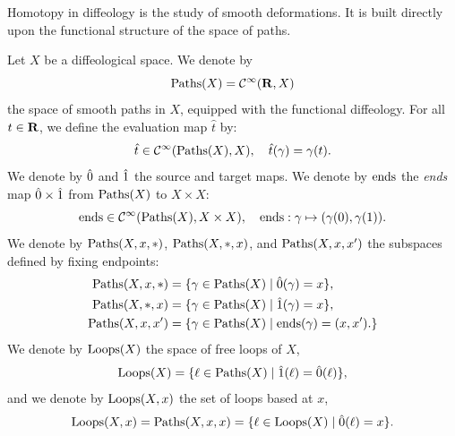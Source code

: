  \begin{article}
    Homotopy in diffeology is the study of smooth deformations.
    It is built directly upon the functional structure of the space of paths.
    
    Let $X$ be a diffeological space.
    We denote by
    $$
      \operatorname{Paths}(X) = {\mathcal{C}}^\infty({\mathbf{R}},X)
      $$
    the space of smooth paths in $X$,
    equipped with the functional diffeology.
    For all $t \in {\mathbf{R}}$,
    we define the evaluation map $\hat t$ by:
    $$
      \hat t \in {\mathcal{C}}^\infty(\operatorname{Paths}(X), X),
      \quad
      \hat t(\gamma) = \gamma(t).
      $$
    We denote by $\hat 0$ and $\hat 1$ the source and target maps.
    We denote by $\operatorname{ends}$ the \emph{ends} map $\hat 0 \times \hat 1$ from $\operatorname{Paths}(X)$ to $X \times X$:
    $$
      \operatorname{ends} \in {\mathcal{C}}^\infty(\operatorname{Paths}(X), X \times X),
      \quad
      \operatorname{ends} : \gamma \mapsto (\gamma(0),\gamma(1)).
      $$
    We denote by $\operatorname{Paths}(X,x,\ast)$,
    $\operatorname{Paths}(X,\ast,x)$,
    and $\operatorname{Paths}(X,x,x')$ the subspaces defined by fixing endpoints:
    \begin{align*}
      \operatorname{Paths}(X,x,\ast) &= \{ \gamma \in \operatorname{Paths}(X) \mid \hat 0(\gamma) = x \},\\
      \operatorname{Paths}(X,\ast,x) &= \{ \gamma \in \operatorname{Paths}(X) \mid \hat 1(\gamma) = x \},\\
      \operatorname{Paths}(X,x,x') &= \{ \gamma \in \operatorname{Paths}(X) \mid \operatorname{ends}(\gamma) = (x,x'). \}
    \end{align*}
    We denote by $\operatorname{Loops}(X)$ the space of free loops of $X$,
    $$
      \operatorname{Loops}(X) = \{ \ell \in \operatorname{Paths}(X) \mid \hat 1(\ell)=\hat 0(\ell) \},
      $$
    and we denote by $\operatorname{Loops}(X,x)$ the set of loops based at $x$,
    $$
      \operatorname{Loops}(X,x) = \operatorname{Paths}(X,x,x) = \{ \ell \in \operatorname{Loops}(X) \mid \hat 0(\ell) = x \}.
      $$
  \end{article}
  
